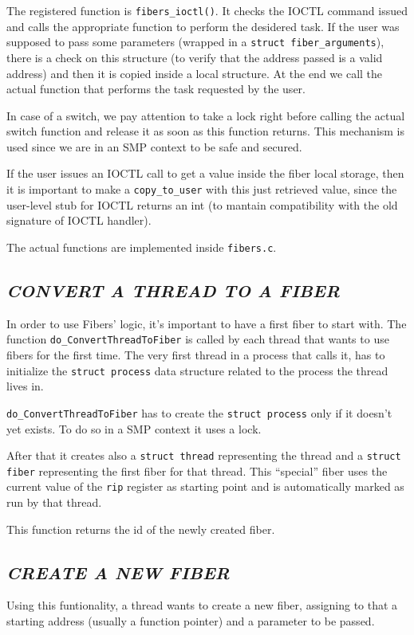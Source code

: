 \documentclass[a4paper]{article}
\begin{document}
The registered function is \texttt{fibers\_ioctl()}. It checks the IOCTL command issued and calls the appropriate function to perform the desidered task. If the user was supposed to pass some parameters (wrapped in a \texttt{struct fiber\_arguments}), there is a check on this structure (to verify that the address passed is a valid address) and then it is copied inside a local structure. At the end we call the actual function that performs the task requested by the user.

In case of a switch, we pay attention to take a lock right before calling the actual switch function and release it as soon as this function returns. This mechanism is used since we are in an SMP context to be safe and secured.

If the user issues an IOCTL call to get a value inside the fiber local storage, then it is important to make a \texttt{copy\_to\_user} with this just retrieved value, since the user-level stub for IOCTL returns an int (to mantain compatibility with the old signature of IOCTL handler).

The actual functions are implemented inside \texttt{fibers.c}.

\subsection*{\textit{CONVERT A THREAD TO A FIBER}}
In order to use Fibers' logic, it's important to have a first fiber to start with. The function \texttt{do\_ConvertThreadToFiber} is called by each thread that wants to use fibers for the first time. The very first thread in a process that calls it, has to initialize the \texttt{struct process} data structure related to the process the thread lives in.

\texttt{do\_ConvertThreadToFiber} has to create the \texttt{struct process} only if it doesn't yet exists. To do so in a SMP context it uses a lock.

After that it creates also a \texttt{struct thread} representing the thread and a \texttt{struct fiber} representing the first fiber for that thread.
This ``special'' fiber uses the current value of the \texttt{rip} register as starting point and is automatically marked as run by that thread.

This function returns the id of the newly created fiber.

\subsection*{\textit{CREATE A NEW FIBER}}
Using this funtionality, a thread wants to create a new fiber, assigning to that a starting address (usually a function pointer) and a parameter to be passed.
\end{document}
